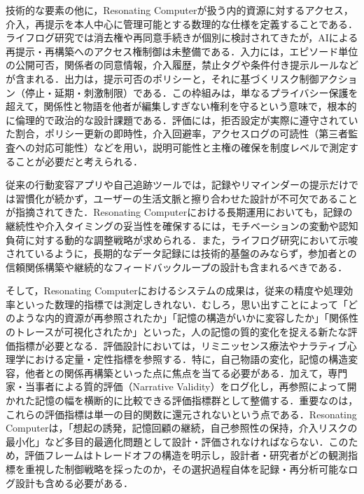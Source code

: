 \documentclass[originalpaper]{jsaiart}
\begin{document}
技術的な要素の他に，Resonating Computerが扱う内的資源に対するアクセス，介入，再提示を本人中心に管理可能とする数理的な仕様を定義することである．ライフログ研究では消去権や再同意手続きが個別に検討されてきたが，AIによる再提示・再構築へのアクセス権制御は未整備である．入力には，エピソード単位の公開可否，関係者の同意情報，介入履歴，禁止タグや条件付き提示ルールなどが含まれる．出力は，提示可否のポリシーと，それに基づくリスク制御アクション（停止・延期・刺激制限）である．この枠組みは，単なるプライバシー保護を超えて，関係性と物語を他者が編集しすぎない権利を守るという意味で，根本的に倫理的で政治的な設計課題である\cite{ricoeur2004}．評価には，拒否設定が実際に遵守されていた割合，ポリシー更新の即時性，介入回避率，アクセスログの可読性（第三者監査への対応可能性）などを用い，説明可能性と主権の確保を制度レベルで測定することが必要だと考えられる．

従来の行動変容アプリや自己追跡ツールでは，記録やリマインダーの提示だけでは習慣化が続かず，ユーザーの生活文脈と擦り合わせた設計が不可欠であることが指摘されてきた\cite{stawarz2015}．Resonating Computerにおける長期運用においても，記録の継続性や介入タイミングの妥当性を確保するには，モチベーションの変動や認知負荷に対する動的な調整戦略が求められる．また，ライフログ研究において示唆されているように，長期的なデータ記録には技術的基盤のみならず，参加者との信頼関係構築や継続的なフィードバックループの設計も含まれるべきである\cite{quadrana2018}．

そして，Resonating Computerにおけるシステムの成果は，従来の精度や処理効率といった数理的指標では測定しきれない．むしろ，思い出すことによって「どのような内的資源が再参照されたか」「記憶の構造がいかに変容したか」「関係性のトレースが可視化されたか」といった，人の記憶の質的変化を捉える新たな評価指標が必要となる．評価設計においては，リミニッセンス療法やナラティブ心理学における定量・定性指標を参照する\cite{kontos2011,sedikides2015}．特に，自己物語の変化，記憶の構造変容，他者との関係再構築といった点に焦点を当てる必要がある．加えて，専門家・当事者による質的評価（Narrative Validity）をログ化し，再参照によって開かれた記憶の幅を横断的に比較できる評価指標群として整備する．重要なのは，これらの評価指標は単一の目的関数に還元されないという点である．Resonating Computerは，「想起の誘発，記憶回顧の継続，自己参照性の保持，介入リスクの最小化」など多目的最適化問題として設計・評価されなければならない．このため，評価フレームはトレードオフの構造を明示し，設計者・研究者がどの観測指標を重視した制御戦略を採ったのか，その選択過程自体を記録・再分析可能なログ設計も含める必要がある．
\end{document}
